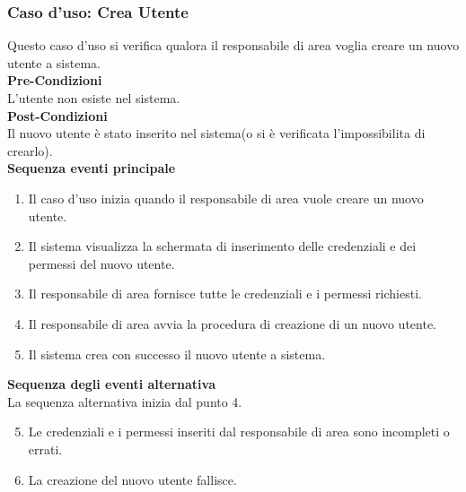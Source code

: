 \documentclass[green, fancy, 11pt]{elegantbook}
\begin{document}
\subsubsection{Caso d'uso: Crea Utente}
\noindent
Questo caso d’uso si verifica qualora il responsabile di area voglia creare un nuovo utente a sistema.\\
\textbf{Pre-Condizioni}\\
L’utente non esiste nel sistema.\\
\textbf{Post-Condizioni}\\
Il nuovo utente è stato inserito nel sistema(o si è verificata l’impossibilita di crearlo).\\
\textbf{Sequenza eventi principale}\\
\begin{enumerate}
	\item Il caso d’uso inizia quando il responsabile di area vuole creare un nuovo utente.
	\item Il sistema visualizza la schermata di inserimento delle credenziali e dei permessi del nuovo utente.
	\item Il responsabile di area fornisce tutte le credenziali e i permessi richiesti.
	\item Il responsabile di area avvia la procedura di creazione di un nuovo utente.
	\item Il sistema crea con successo il nuovo utente a sistema.
\end{enumerate}
\textbf{Sequenza degli eventi alternativa}\\
La sequenza alternativa inizia dal punto 4.
\begin{enumerate}
	\setcounter{enumi}{4}
	\item Le credenziali e i permessi inseriti dal responsabile di area sono incompleti o errati.
	\item La creazione del nuovo utente fallisce.
\end{enumerate}
\newpage
\end{document}
